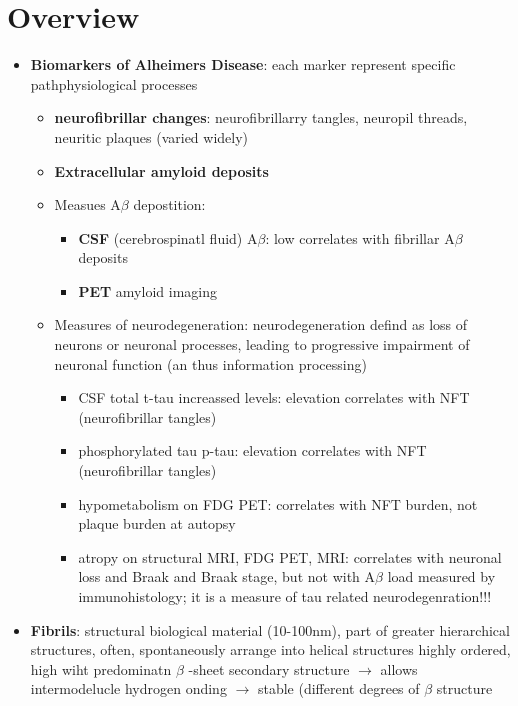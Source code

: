 \documentclass[fleqn]{article}\usepackage{caption}
\author{Anne-Lene Sax}
\date{\today}
\begin{document}
\section{Overview}
\begin{itemize}

\item \textbf{Biomarkers of Alheimers Disease}:  each marker represent specific pathphysiological processes
\begin{itemize}
\item \textbf{neurofibrillar changes}: neurofibrillarry tangles, neuropil threads, neuritic plaques (varied widely) %
\item  \textbf{Extracellular amyloid deposits} %

\item Measues A$\beta$ depostition:
\begin{itemize}
\item \textbf{CSF} (cerebrospinatl fluid) A$\beta$: low correlates with fibrillar A$\beta$ deposits %
\item \textbf{PET} amyloid imaging %
\end{itemize} 
\item Measures of neurodegeneration: neurodegeneration defind as loss of neurons or  neuronal processes,  leading to progressive impairment of neuronal function (an thus information processing)
\begin{itemize}
\item CSF total t-tau increassed levels: elevation correlates with NFT (neurofibrillar tangles) %
\item phosphorylated tau p-tau: elevation correlates with NFT (neurofibrillar tangles) %
\item hypometabolism on FDG PET: correlates with NFT burden, not plaque burden at autopsy %
\item atropy on structural MRI, FDG PET, MRI: correlates with neuronal loss and Braak and Braak stage, but not with A$\beta$ load measured by immunohistology; it is a measure of tau related neurodegenration!!! %
\end{itemize}
\end{itemize}

\item \textbf{Fibrils}: structural biological material (10-100nm), part of greater hierarchical structures, often, spontaneously arrange into helical structures
highly ordered, high wiht predominatn $ \beta $ -sheet secondary structure $\rightarrow$ allows intermodelucle hydrogen onding $\rightarrow$  stable (different degrees of $ \beta$ structure


\end{itemize}
\end{document}
